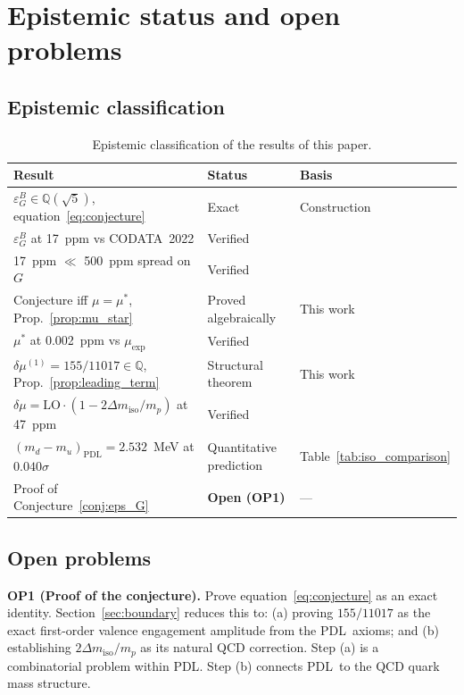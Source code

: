\documentclass[11pt,a4paper]{article}
\theoremstyle{definition}
\newcommand{\PDL}{\textnormal{PDL}}
\newcommand{\epsg}{\varepsilon_G}
\newcommand{\muexp}{\mu_{\mathrm{exp}}}
\newcommand{\mustar}{\mu^*}
\newcommand{\dmu}{\delta\mu}
\newcommand{\dmiso}{\Delta m_{\mathrm{iso}}}
\begin{document}
\section{Epistemic status and open problems}
\label{sec:open}

\subsection{Epistemic classification}

\begin{table}[ht]
\centering
\caption{Epistemic classification of the results of this paper.}
\label{tab:epistemic}
\bigskip
\begin{tabular}{p{7.5cm}p{2.8cm}p{3.5cm}}
\toprule
Result & Status & Basis \\
\midrule
$\epsg^B \in \mathbb{Q}(\sqrt{5})$, equation~\eqref{eq:conjecture} & Exact & Construction \\
$\epsg^B$ at 17~ppm vs CODATA~2022 & Verified & \cite{CODATA_2022} \\
17~ppm $\ll$ 500~ppm spread on $G$ & Verified & \cite{Quinn_2013,Li_2018,NIST_2024} \\
Conjecture iff $\mu = \mustar$, Prop.~\ref{prop:mu_star} & Proved algebraically & This work \\
$\mustar$ at 0.002~ppm vs $\muexp$ & Verified & \cite{CODATA_2022} \\
$\dmu^{(1)} = 155/11017 \in \mathbb{Q}$, Prop.~\ref{prop:leading_term} & Structural theorem & This work \\
$\dmu = \mathrm{LO}\cdot(1-2\dmiso/m_p)$ at 47~ppm & Verified & \cite{PDG_2024} \\
$(m_d-m_u)_{\mathrm{PDL}} = 2.532$~MeV at $0.040\sigma$ & Quantitative prediction & Table~\ref{tab:iso_comparison} \\
Proof of Conjecture~\ref{conj:eps_G} & \textbf{Open (OP1)} & --- \\
\bottomrule
\end{tabular}
\end{table}

\subsection{Open problems}

\medskip\noindent\textbf{OP1 (Proof of the conjecture).} Prove equation~\eqref{eq:conjecture} as an exact identity. Section~\ref{sec:boundary} reduces this to: (a) proving $155/11017$ as the exact first-order valence engagement amplitude from the \PDL\ axioms; and (b) establishing $2\dmiso/m_p$ as its natural QCD correction. Step (a) is a combinatorial problem within \PDL. Step (b) connects \PDL\ to the QCD quark mass structure.
\end{document}
